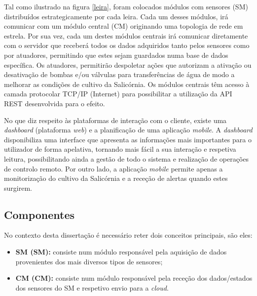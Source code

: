 Tal como ilustrado na figura \ref{leira}, foram colocados módulos com sensores (SM) distribuídos estrategicamente por cada leira. Cada um desses módulos, irá comunicar com um módulo central (CM) originando uma topologia de rede em estrela.  Por sua vez, cada um destes módulos centrais irá comunicar diretamente com o servidor que receberá todos os dados adquiridos tanto pelos sensores como por atuadores, permitindo que estes sejam guardados numa base de dados específica. Os atuadores, permitirão despoletar ações que autorizam a ativação ou desativação de bombas e/ou válvulas para transferências de água de modo a melhorar as condições de cultivo da Salicórnia. 
Os módulos centrais têm acesso à camada protocolar \ac{TCP}/\ac{IP} (Internet) para possibilitar a utilização da \acs{API} \acs{REST} desenvolvida para o efeito. 

No que diz respeito às plataformas de interação com o cliente, existe uma \textit{dashboard} (plataforma \textit{web}) e a planificação de uma aplicação \textit{mobile}. A \textit{dashboard} disponibiliza uma interface que apresenta as informações mais importantes para o utilizador de forma apelativa, tornando mais fácil a sua interação e respetiva leitura, possibilitando ainda a gestão de todo o sistema e realização de operações de controlo remoto. Por outro lado, a aplicação \textit{mobile} permite apenas a monitorização do cultivo da Salicórnia e a receção de alertas quando estes surgirem.

\subsection{Componentes}

No contexto desta dissertação é necessário reter dois conceitos principais, são eles: 

\begin{itemize}
	\item \textbf{\acl{SM} (SM):} consiste num módulo responsável pela aquisição de dados provenientes dos mais diversos tipos de sensores; 
	
	
	\item \textbf{\acl{CM} (CM):} consiste num módulo responsável pela receção dos dados/estados dos sensores do \acl{SM} e respetivo envio para a \textit{cloud}.  
	
\end{itemize}


